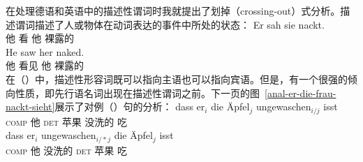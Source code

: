在处理德语和英语中的描述性谓词时我就提出了划掉（crossing-out）式分析\citep{Mueller2004c,Mueller2008a}。描述谓词描述了人或物体在动词表达的事件中所处的状态：
\eal
\ex 
\gll Er sah sie nackt.\footnotemark\\
	他 看 他 裸露的\\
\ex 
\gll He saw her naked.\\
	他 看见 他 裸露的\\
\zl
在（）中，描述性形容词既可以指向主语也可以指向宾语。但是，有一个很强的倾向性质，即先行语名词出现在描述性谓词之前\citep[]{Loetscher85}。下一页的图~\vref{anal-er-die-frau-nackt-sieht}展示了对例（）句的分析：
\eal
\ex 
\gll dass er$_i$ die Äpfel$_j$ ungewaschen$_{i/j}$ isst\\
	 \textsc{comp} 他 \textsc{det} 苹果 没洗的 吃\\
\ex 
\gll dass er$_i$ ungewaschen$_{i/*j}$ die Äpfel$_j$ isst\\
	 \textsc{comp} 他 没洗的 \textsc{det} 苹果 吃\\
\zl
